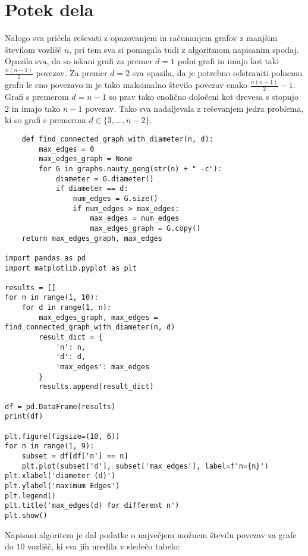 \documentclass[12pt,a4paper]{amsart}
\theoremstyle{definition} %
\theoremstyle{plain} %
\begin{document}
\section{Potek dela}

Nalogo sva pričela reševati z opazovanjem in računanjem grafov z manjšim številom vozlišč $n$, pri tem sva si
pomagala tudi z algoritmom napisanim spodaj. Opazila sva, da so iskani grafi za premer $d = 1$ polni grafi in
imajo kot taki $\frac{n (n - 1)}{2}$ povezav. Za premer $d = 2$ sva opazila, da je potrebno odstraniti
polnemu grafu le eno povezavo in je tako maksimalno število povezav enako $\frac{n (n - 1)}{2} - 1$. Grafi s
premerom $d = n - 1$ so prav tako enolično določeni kot drevesa s stopnjo 2 in imajo tako $n - 1$ povezav.
Tako sva nadaljevala z reševanjem jedra problema, ki so grafi s premerom $d \in \{3, \dots, n - 2\}$.\\

\begin{verbatim}
    def find_connected_graph_with_diameter(n, d):
        max_edges = 0
        max_edges_graph = None
        for G in graphs.nauty_geng(str(n) + " -c"):
            diameter = G.diameter()
            if diameter == d:
                num_edges = G.size()
                if num_edges > max_edges:
                    max_edges = num_edges
                    max_edges_graph = G.copy()
    return max_edges_graph, max_edges

import pandas as pd
import matplotlib.pyplot as plt

results = []
for n in range(1, 10):
    for d in range(1, n):
        max_edges_graph, max_edges = find_connected_graph_with_diameter(n, d)
        result_dict = {
            'n': n,
            'd': d,
            'max_edges': max_edges
        }
        results.append(result_dict)

df = pd.DataFrame(results)
print(df)

plt.figure(figsize=(10, 6))
for n in range(1, 9):
    subset = df[df['n'] == n]
    plt.plot(subset['d'], subset['max_edges'], label=f'n={n}')
plt.xlabel('diameter (d)')
plt.ylabel('maximum Edges')
plt.legend()
plt.title('max_edges(d) for different n')
plt.show()

\end{verbatim}

Napisani algoritem je dal podatke o največjem možnem številu povezav za grafe do $10$ vozlišč,
ki sva jih uredila v sledečo tabelo:
\end{document}
